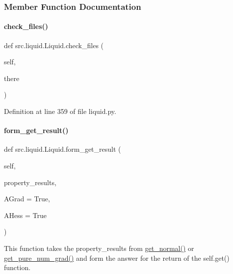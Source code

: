 \subsubsection{Member Function Documentation}
\mbox{\label{classsrc_1_1liquid_1_1Liquid_afdbdeb57ce8f506a90711367e9926586}} 
\paragraph{\texorpdfstring{check\+\_\+files()}{check\_files()}}
{\footnotesize\ttfamily def src.\+liquid.\+Liquid.\+check\+\_\+files (\begin{DoxyParamCaption}\item[{}]{self,  }\item[{}]{there }\end{DoxyParamCaption})}



Definition at line 359 of file liquid.\+py.

\mbox{\label{classsrc_1_1liquid_1_1Liquid_a6c7d6b8ce3f748fba7db1d390ff6fed9}} 
\paragraph{\texorpdfstring{form\+\_\+get\+\_\+result()}{form\_get\_result()}}
{\footnotesize\ttfamily def src.\+liquid.\+Liquid.\+form\+\_\+get\+\_\+result (\begin{DoxyParamCaption}\item[{}]{self,  }\item[{}]{property\+\_\+results,  }\item[{}]{A\+Grad = {\ttfamily True},  }\item[{}]{A\+Hess = {\ttfamily True} }\end{DoxyParamCaption})}



This function takes the property\+\_\+results from \hyperlink{classsrc_1_1liquid_1_1Liquid_ae6a946b860b70f1b002acdff15fdb023}{get\+\_\+normal()} or \hyperlink{classsrc_1_1liquid_1_1Liquid_adec909709edf0a79148d87d97ae2fde1}{get\+\_\+pure\+\_\+num\+\_\+grad()} and form the answer for the return of the self.\+get() function. 

